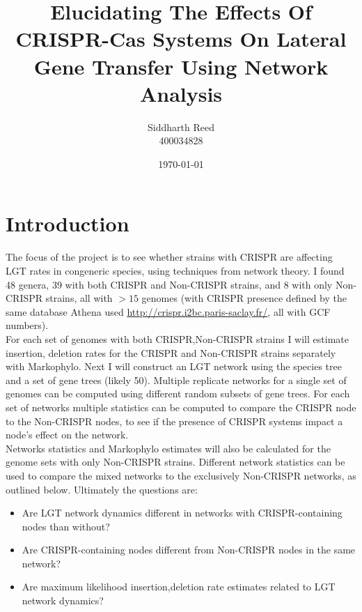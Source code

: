 \documentclass[12pt,letter]{article}
\begin{document}
\title{Elucidating The Effects Of CRISPR-Cas Systems On Lateral Gene Transfer Using Network Analysis}
\author{Siddharth Reed\\ 400034828}
\date{\today}
\maketitle
\newpage
\section*{Introduction}
The focus of the project is to see whether strains with CRISPR are affecting LGT rates in congeneric species, using techniques from network theory. I found 48  genera, 39 with both CRISPR and Non-CRISPR strains, and 8 with only Non-CRISPR strains, all with $>15$ genomes (with CRISPR presence defined by the same database Athena used \url{http://crispr.i2bc.paris-saclay.fr/}, all with GCF numbers).\\
For each set of genomes with both CRISPR,Non-CRISPR strains I will estimate insertion, deletion rates for the CRISPR and Non-CRISPR strains separately with Markophylo. Next I will construct an LGT network using the species tree and a set of gene trees (likely 50). Multiple replicate networks for a single set of genomes can be computed using different random subsets of gene trees. For each set of networks multiple statistics can be computed to compare the CRISPR node to the Non-CRISPR nodes, to see if the presence of CRISPR systems impact a node's effect on the network.\\
Networks statistics and Markophylo estimates will also be calculated for the genome sets with only Non-CRISPR strains. Different network statistics can be used to compare the mixed networks to the exclusively Non-CRISPR networks, as outlined below.
Ultimately the questions are:
\begin{itemize}
    \item Are LGT network dynamics different in networks with CRISPR-containing nodes than without?
    \item Are CRISPR-containing nodes different from Non-CRISPR nodes in the same network?
    \item Are maximum likelihood insertion,deletion rate estimates related to LGT network dynamics?
\end{itemize}
\end{document}
